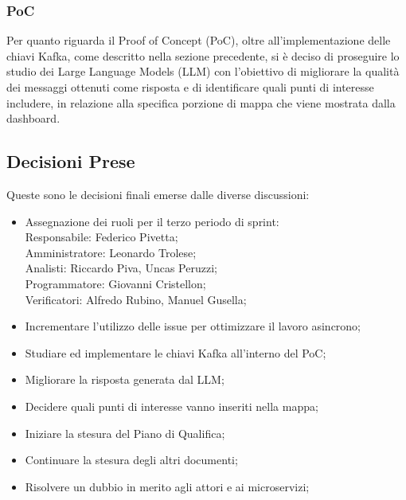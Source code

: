 \documentclass[10pt]{article}
\begin{document}
\subsubsection{PoC}
Per quanto riguarda il Proof of Concept (PoC), oltre all'implementazione delle chiavi Kafka, come descritto nella sezione precedente, si è deciso di proseguire lo studio dei Large Language Models (LLM) con l'obiettivo di migliorare la qualità dei messaggi ottenuti come risposta e di identificare quali punti di interesse includere, in relazione alla specifica porzione di mappa che viene mostrata dalla dashboard.\\

\subsection{Decisioni Prese}
Queste sono le decisioni finali emerse dalle diverse discussioni:
\begin{itemize}
    \item Assegnazione dei ruoli per il terzo periodo di sprint:\\
            \vspace{1mm}
            Responsabile: Federico Pivetta;\\
            Amministratore: Leonardo Trolese;\\
            Analisti: Riccardo Piva, Uncas Peruzzi;\\
            Programmatore: Giovanni Cristellon;\\
            Verificatori: Alfredo Rubino, Manuel Gusella;\\
    \item Incrementare l'utilizzo delle issue per ottimizzare il lavoro asincrono;
    \item Studiare ed implementare le chiavi Kafka all'interno del PoC;
    \item Migliorare la risposta generata dal LLM;
    \item Decidere quali punti di interesse vanno inseriti nella mappa;
    \item Iniziare la stesura del Piano di Qualifica;
    \item Continuare la stesura degli altri documenti;
    \item Risolvere un dubbio in merito agli attori e ai microservizi;
\end{itemize}
\end{document}
